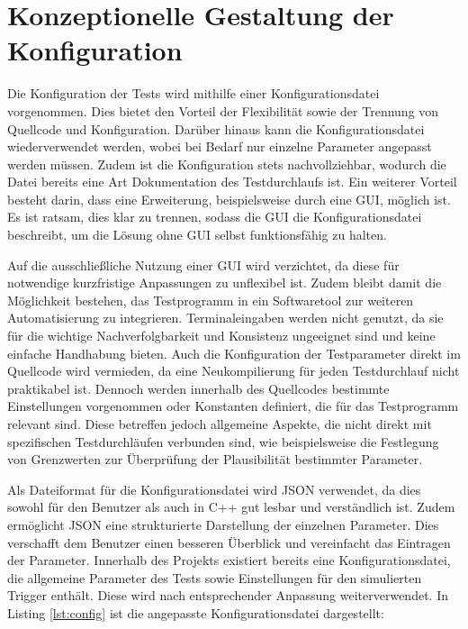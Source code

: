 \section{Konzeptionelle Gestaltung der Konfiguration}

Die Konfiguration der Tests wird mithilfe einer Konfigurationsdatei vorgenommen. Dies bietet den Vorteil der Flexibilität sowie der Trennung von Quellcode 
und Konfiguration. Darüber hinaus kann die Konfigurationsdatei wiederverwendet werden, wobei bei Bedarf nur einzelne Parameter angepasst werden müssen. Zudem ist die Konfiguration 
stets nachvollziehbar, wodurch die Datei bereits eine Art Dokumentation des Testdurchlaufs ist. Ein weiterer Vorteil besteht darin, dass eine Erweiterung, beispielsweise durch 
eine \acs{GUI}, möglich ist. Es ist ratsam, dies klar zu trennen, sodass die \acs{GUI} die Konfigurationsdatei beschreibt, um die Lösung ohne \acs{GUI} selbst funktionsfähig zu halten.

Auf die ausschließliche Nutzung einer \acs{GUI} wird verzichtet, da diese für notwendige kurzfristige Anpassungen zu unflexibel ist. Zudem bleibt damit die Möglichkeit bestehen, das 
Testprogramm in ein Softwaretool zur weiteren Automatisierung zu integrieren. Terminaleingaben werden nicht genutzt, da sie für die wichtige Nachverfolgbarkeit und Konsistenz 
ungeeignet sind und keine einfache Handhabung bieten. Auch die Konfiguration der Testparameter direkt im Quellcode wird vermieden, da eine Neukompilierung für jeden 
Testdurchlauf nicht praktikabel ist. Dennoch werden innerhalb des Quellcodes bestimmte Einstellungen vorgenommen oder Konstanten definiert, die für das Testprogramm relevant sind. 
Diese betreffen jedoch allgemeine Aspekte, die nicht direkt mit spezifischen Testdurchläufen verbunden sind, wie beispielsweise die Festlegung von Grenzwerten zur Überprüfung der 
Plausibilität bestimmter Parameter.

Als Dateiformat für die Konfigurationsdatei wird JSON verwendet, da dies sowohl für den Benutzer als auch in C++ gut lesbar und verständlich ist. Zudem ermöglicht JSON eine 
strukturierte Darstellung der einzelnen Parameter. Dies verschafft dem Benutzer einen besseren Überblick und vereinfacht das Eintragen der Parameter. Innerhalb des Projekts 
existiert bereits eine Konfigurationsdatei, die allgemeine Parameter des Tests sowie Einstellungen für den simulierten Trigger enthält. Diese wird nach entsprechender Anpassung 
weiterverwendet. In Listing \ref{lst:config} ist die angepasste Konfigurationsdatei dargestellt:

